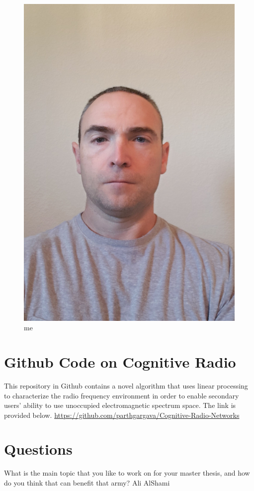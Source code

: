 \begin{figure}
    \centering
    \includegraphics[scale=.1]{self pic2.jpg}
    \caption{me}
    \label{fig:me}
\end{figure}
\section{Github Code on Cognitive Radio}
This repository in Github contains a novel algorithm that uses linear processing to characterize the radio frequency environment in order to enable secondary users' ability to use unoccupied electromagnetic spectrum space.  The link is provided below.
\url{https://github.com/parthgargava/Cognitive-Radio-Networks}

\section{Questions}
What is the main topic that you like to work on for your master thesis, and how do you think that can benefit that army? Ali AlShami
\newline
